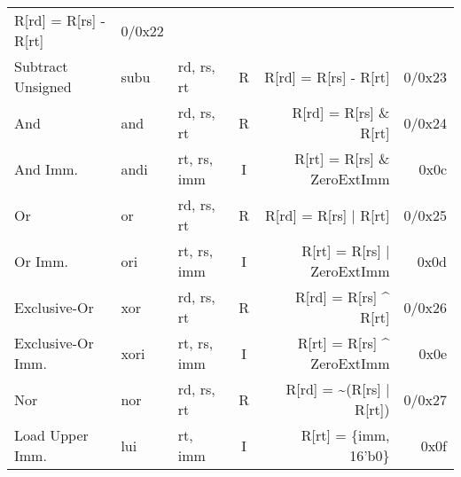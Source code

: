 \begin{tabularx}{\textwidth}{lMAcDr}
    R[rd] = R[rs] - R[rt]                          \footnotemark[1]                 & 0/0x22                       \\
    Subtract Unsigned                                                               & subu   & rd, rs, rt    & R &
    R[rd] = R[rs] - R[rt]                                                           & 0/0x23                       \\
    And                                                                             & and    & rd, rs, rt    & R &
    R[rd] = R[rs] \& R[rt]                                                          & 0/0x24                       \\
    And Imm.                                                                        & andi   & rt, rs, imm   & I &
    R[rt] = R[rs] \& ZeroExtImm                    \footnotemark[3]                 & 0x0c                         \\
    Or                                                                              & or     & rd, rs, rt    & R &
    R[rd] = R[rs] | R[rt]                                                           & 0/0x25                       \\
    Or Imm.                                                                         & ori    & rt, rs, imm   & I &
    R[rt] = R[rs] | ZeroExtImm                     \footnotemark[3]                 & 0x0d                         \\
    Exclusive-Or                                                                    & xor    & rd, rs, rt    & R &
    R[rd] = R[rs] \textasciicircum{} R[rt]                                          & 0/0x26                       \\
    Exclusive-Or Imm.                                                               & xori   & rt, rs, imm   & I &
    R[rt] = R[rs] \textasciicircum{} ZeroExtImm    \footnotemark[3]                 & 0x0e                         \\
    Nor                                                                             & nor    & rd, rs, rt    & R &
    R[rd] = \textasciitilde (R[rs] | R[rt])                                         & 0/0x27                       \\
    Load Upper Imm.                                                                 & lui    & rt, imm       & I &
    R[rt] = \{imm, 16'b0\}                                                          & 0x0f                         \\

\end{tabularx}
